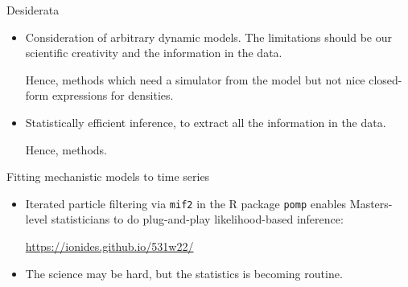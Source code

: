\documentclass{beamer}
\begin{document}
\begin{frame}{Desiderata}

  \begin{itemize}
    \item Consideration of arbitrary dynamic models. The limitations should be our scientific creativity and the information in the data.

      \vspace{2mm}
      
     Hence,  methods which need a simulator from the model but not nice closed-form expressions for densities.

     \vspace{2mm}
     
    \item Statistically efficient inference, to extract all the information in the data.

      \vspace{2mm}
      
    Hence,  methods.

      \end{itemize}
  \end{frame}

\begin{frame}{Fitting mechanistic models to time series}
  
    \vspace{8mm}

    \begin{itemize}
    \item  Iterated particle filtering via \texttt{mif2} in the R package \texttt{pomp} enables Masters-level statisticians to do plug-and-play likelihood-based inference:

      \vspace{2mm}

      \url{https://ionides.github.io/531w22/}

      \vspace{5mm}
      \item
      The science may be hard, but the statistics is becoming routine.


    \end{itemize}
\end{frame}
\end{document}

